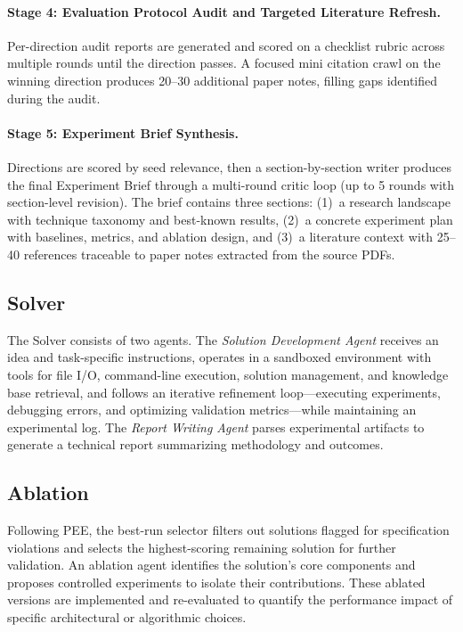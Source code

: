 \paragraph{Stage 4: Evaluation Protocol Audit and Targeted Literature Refresh.}
Per-direction audit reports are generated and scored on a checklist rubric across multiple rounds until the direction passes.
A focused mini citation crawl on the winning direction produces 20--30 additional paper notes, filling gaps identified during the audit.

\paragraph{Stage 5: Experiment Brief Synthesis.}
Directions are scored by seed relevance, then a section-by-section writer produces the final Experiment Brief through a multi-round critic loop (up to 5 rounds with section-level revision). The brief contains three sections: (1)~a research landscape with technique taxonomy and best-known results, (2)~a concrete experiment plan with baselines, metrics, and ablation design, and (3)~a literature context with 25--40 references traceable to paper notes extracted from the source PDFs.


\subsection{Solver}

The Solver consists of two agents.
The \emph{Solution Development Agent} receives an idea and task-specific instructions, operates in a sandboxed environment with tools for file I/O, command-line execution, solution management, and knowledge base retrieval, and follows an iterative refinement loop---executing experiments, debugging errors, and optimizing validation metrics---while maintaining an experimental log.
The \emph{Report Writing Agent} parses experimental artifacts to generate a technical report summarizing methodology and outcomes.

\subsection{Ablation}

Following PEE, the best-run selector filters out solutions flagged for specification violations and selects the highest-scoring remaining solution for further validation.
An ablation agent identifies the solution's core components and proposes controlled experiments to isolate their contributions.
These ablated versions are implemented and re-evaluated to quantify the performance impact of specific architectural or algorithmic choices.

